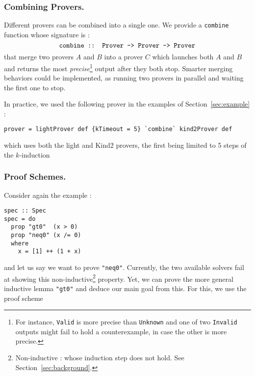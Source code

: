 %


\subsubsection{Combining Provers.}\label{combining-provers}
Different provers can be combined into a single one. We provide a \texttt{combine} function whose signature is : $$\texttt{combine :: Prover -\textgreater{} Prover -\textgreater{} Prover}$$ that merge two provers $A$ and $B$ into a prover $C$ which
launches both $A$ and $B$ and returns the most \emph{precise}\footnote{For instance, \texttt{Valid} is more {precise} than \texttt{Unknown} and one of two \texttt{Invalid} outputs might fail to hold a counterexample, in case the other is more precise.} output after they both stop. Smarter merging behaviors could be implemented, as running two provers in parallel and waiting the first one to stop.

In practice, we used the following prover in the examples of Section~\ref{sec:example} :
\begin{lstlisting}[frame=single]
prover = lightProver def {kTimeout = 5} `combine` kind2Prover def
\end{lstlisting}
which uses both the light and Kind2 provers, the first being limited to 5 steps of the $k$-induction 

\subsubsection{Proof Schemes.}\label{proof-schemes}

Consider again the example :

\begin{lstlisting}[frame=single]
spec :: Spec
spec = do
  prop "gt0"  (x > 0)
  prop "neq0" (x /= 0)
  where
    x = [1] ++ (1 + x)

\end{lstlisting}
and let us say we want to prove \texttt{"neq0"}. Currently, the two available solvers fail at showing this non-inductive\footnote{Non-inductive : whose induction step does not hold. See Section~\ref{sec:background}.} property. Yet, we can prove the more general
inductive lemma \texttt{"gt0"} and deduce our main goal from this. For
this, we use the proof scheme

